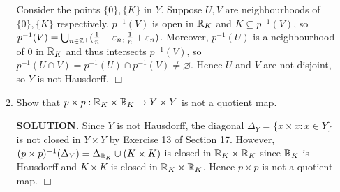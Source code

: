 \documentclass{article}
\begin{document}
\begin{enumerate}
\begin{enumerate}
        Consider the points $\{0\}, \{K\}$ in $Y$. Suppose $U, V$ are neighbourhoods of $\{0\}, \{K\}$ respectively. $p^{-1}(V)$ is open in $\mathbb{R}_K$ and $K \subseteq p^{-1}(V)$, so $p^{-1}(V) = \bigcup_{n \in \mathbb{Z}^+} (\frac1n - \varepsilon_n, \frac1n + \varepsilon_n)$. Moreover, $p^{-1}(U)$ is a neighbourhood of $0$ in $\mathbb{R}_K$ and thus intersects $p^{-1}(V)$, so $p^{-1}(U \cap V) = p^{-1}(U) \cap p^{-1}(V) \neq \varnothing$. Hence $U$ and $V$ are not disjoint, so $Y$ is not Hausdorff. $\Box$

        \item Show that $p \times p: \mathbb{R}_K \times \mathbb{R}_K \rightarrow Y \times Y$ is not a quotient map.

        {\bf SOLUTION.} Since $Y$ is not Hausdorff, the diagonal $\Delta_Y = \{x \times x: x \in Y\}$ is not closed in $Y \times Y$ by Exercise 13 of Section 17. However, $(p \times p)^{-1}(\Delta_Y) = \Delta_{\mathbb{R}_K} \cup (K \times K)$ is closed in $\mathbb{R}_K \times \mathbb{R}_K$ since $\mathbb{R}_K$ is Hausdorff and $K \times K$ is closed in $\mathbb{R}_K \times \mathbb{R}_K$. Hence $p \times p$ is not a quotient map. $\Box$
    \end{enumerate}
\end{enumerate}
\end{document}
